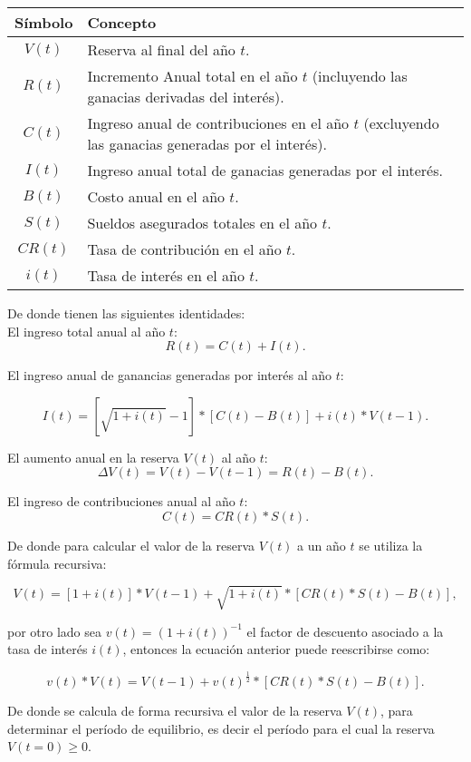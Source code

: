 \documentclass[12pt,letterpaper,titlepage]{article}
\begin{document}
{\begin{center}
\begin{tabular}{|c||p{11cm}|}
	\hline 
	Símbolo & Concepto \\ 
	\hline 
	\hline 
	$V(t)$ & Reserva al final del año $t$. \\ 
	\hline 
	$R(t)$ & Incremento Anual total en el año $t$ (incluyendo las ganacias derivadas del interés). \\ 
	\hline 
	$C(t)$ & Ingreso anual de contribuciones en el año $t$ (excluyendo las ganacias generadas por el interés). \\ 
	\hline 
	$I(t)$ & Ingreso anual total de ganacias generadas por el interés. \\ 
	\hline 
	$B(t)$ & Costo anual en el año $t$. \\ 
	\hline 
	$S(t)$ & Sueldos asegurados totales en el año $t$. \\ 
	\hline 
	$CR(t)$ & Tasa de contribución en el año $t$. \\ 
	\hline 
	$i(t)$ & Tasa de interés en el año $t$. \\ 
	\hline 
\end{tabular} 	
\end{center}

De donde tienen las siguientes identidades:\\

El ingreso total anual al año $t$:
\[ R(t)=C(t)+I(t) .\]

El ingreso anual de ganancias generadas por interés al año $t$:

\[ I(t)=\left[ \sqrt{1+i(t)}-1\right] *\left[ C(t)-B(t)\right] +i(t)*V(t-1) . \]

El aumento anual en la reserva $V(t)$ al año $t$:
\[ \varDelta V(t)=V(t)-V(t-1)=R(t)-B(t) .\]


El ingreso de contribuciones anual al año $t$:
\[ C(t)=CR(t)*S(t) .\]


De donde para calcular el valor de la reserva $V(t)$ a un año $t$ se utiliza la fórmula recursiva:

\[ V(t)=\left[ 1+i(t)\right] *V(t-1)+\sqrt{1+i(t)}*\left[ CR(t)*S(t)-B(t)\right] , \]

por otro lado sea $v(t)=(1+i(t))^{-1}$ el factor de descuento asociado a la tasa de interés $i(t)$, entonces la ecuación anterior puede reescribirse como:

\[ v(t)*V(t)=V(t-1)+v(t)^{\frac{1}{2}}*\left[ CR(t)*S(t)-B(t)\right] . \]

De donde se calcula de forma recursiva el valor de la reserva $V(t)$, para determinar el período de equilibrio, es decir el período para el cual la reserva $V(t=0)\geq0$.\\

}
\end{document}
